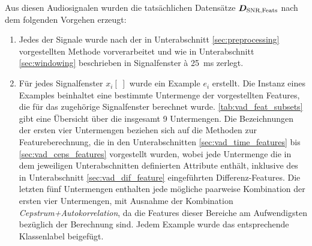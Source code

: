 Aus diesen Audiosignalen wurden die tatsächlichen Datensätze $\boldmath{D_{\text{SNR,Feats}}}$ nach dem folgenden Vorgehen erzeugt:
\begin{enumerate}
\item Jedes der Signale wurde nach der in Unterabschnitt \ref{sec:preprocessing} vorgestellten Methode vorverarbeitet und wie in Unterabschnitt \ref{sec:windowing} beschrieben in Signalfenster \`{a} \SI{25}{\milli\second} zerlegt.
\item Für jedes Signalfenster $x_i[\;]$ wurde ein Example $e_i$ erstellt. Die Instanz eines Examples beinhaltet eine bestimmte Untermenge der vorgestellten Features, die für das zugehörige Signalfenster berechnet wurde. \autoref{tab:vad_feat_subsets} gibt eine Übersicht über die insgesamt 9 Untermengen. Die Bezeichnungen der ersten vier Untermengen beziehen sich auf die Methoden zur Featureberechnung, die in den Unterabschnitten \ref{sec:vad_time_features} bis \ref{sec:vad_ceps_features} vorgestellt wurden, wobei jede Untermenge die in dem jeweiligen Unterabschnitten definierten Attribute enthält, inklusive des in Unterabschnitt \ref{sec:vad_dif_feature} eingeführten Differenz-Features. Die letzten fünf Untermengen enthalten jede mögliche paarweise Kombination der ersten vier Untermengen, mit Ausnahme der Kombination \emph{Cepstrum+Autokorrelation}, da die Features dieser Bereiche am Aufwendigsten bezüglich der Berechnung sind. Jedem Example wurde das entsprechende Klassenlabel beigefügt.


\end{enumerate}
